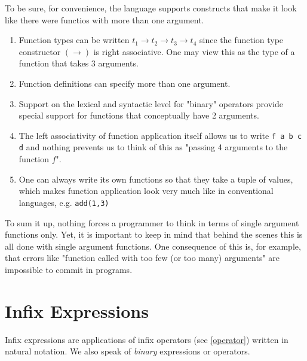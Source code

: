 To be sure, for convenience, the language supports constructs that make it look like there were functios with more than one argument.
\begin{enumerate}
\item Function types can be written $t_1 \rightarrow{} t_2 \rightarrow{} t_3 \rightarrow{} t_4$ since the function type constructor $(\rightarrow)$ is right associative. One may view this as the type of a function that takes 3 arguments.
\item Function definitions can specify more than one argument.
\item Support on the lexical and syntactic level for "binary" operators provide special support for functions that conceptually have 2 arguments.
\item The left associativity of function application itself allows us to write \texttt{f a b c d} and nothing prevents us to think of this as "passing 4 arguments to the function $f$".
\item One can always write its own functions so that they take a tuple of values, which makes function application look very much like in conventional languages, e.g. \texttt{add(1,3)}
\end{enumerate}

To sum it up, nothing forces a \frege{} programmer to think in terms of single argument functions only.
Yet, it is important to keep in mind that behind the scenes this is all done with single argument functions.
One consequence of this is, for example, that errors like "function called with too few (or too many) arguments" are impossible to commit in \frege{} programs.

\section{Infix Expressions} \label{binex}

Infix expressions are applications of infix operators (see \autoref{operator}) written in natural notation. We also speak of  \emph{binary} expressions or operators.

\begin{flushleft}
 \\
 \\
               
   \alt {}  
   \alt {}   
   \alt {}\\
  \\
  \\
  \\
\end{flushleft}

